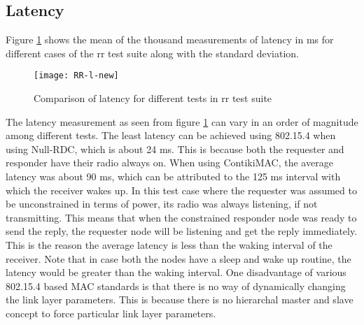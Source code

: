 \subsection{Latency}
Figure \ref{fig:RR-l} shows the mean of the thousand measurements of latency in ms for different cases of the \gls{rr} test suite along with the standard deviation. 

\begin{figure}[tb]
\texttt{[image: RR-l-new]}
\caption{Comparison of latency for different tests in \gls{rr} test suite}
\label{fig:RR-l}
\end{figure}

The latency measurement as seen from figure \ref{fig:RR-l} can vary in an order of magnitude among different tests. The least latency can be achieved using 802.15.4 when using Null-RDC, which is about 24 ms. This is because both the requester and responder have their radio always on. When using ContikiMAC, the average latency was about 90 ms, which can be attributed to the 125 ms interval with which the receiver wakes up. In this test case where the requester was assumed to be unconstrained in terms of power, its radio was always listening, if not transmitting. This means that when the constrained responder node was ready to send the reply, the requester node will be listening and get the reply immediately. This is the reason the average latency is less than the waking interval of the receiver. Note that in case both the nodes have a sleep and wake up routine, the latency would be greater than the waking interval. One disadvantage of various 802.15.4 based MAC standards is that there is no way of dynamically changing the link layer parameters. This is because there is no hierarchal master and slave concept to force particular link layer parameters.

